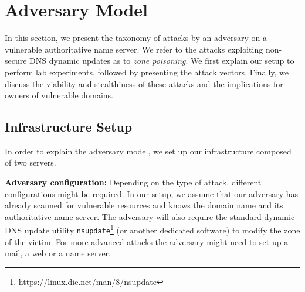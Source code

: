 \section{Adversary Model}

In this section, we present the taxonomy of attacks by an adversary on a vulnerable authoritative name server.
We refer to the attacks exploiting non-secure DNS dynamic updates as to \textit{zone poisoning}.
%
We first explain our setup to perform lab experiments, followed by 
presenting the attack vectors. 
Finally, we discuss the viability and stealthiness of these attacks and %
the implications for owners of vulnerable domains.


\subsection{Infrastructure Setup}

In order to explain the adversary model, we set up our infrastructure %
composed of two servers. 


\textbf{Adversary configuration:} Depending on the type of attack, different configurations might be required. 
In our setup, we assume that our adversary has already scanned for vulnerable 
resources and knows the domain name and its authoritative name server.
The adversary will also require the standard dynamic DNS update utility \texttt{nsupdate}\footnote{%
\url{https://linux.die.net/man/8/nsupdate}} (or another dedicated software) to modify the zone of the victim. %
For more advanced attacks the adversary might need to set up a mail, a web or a name server.

